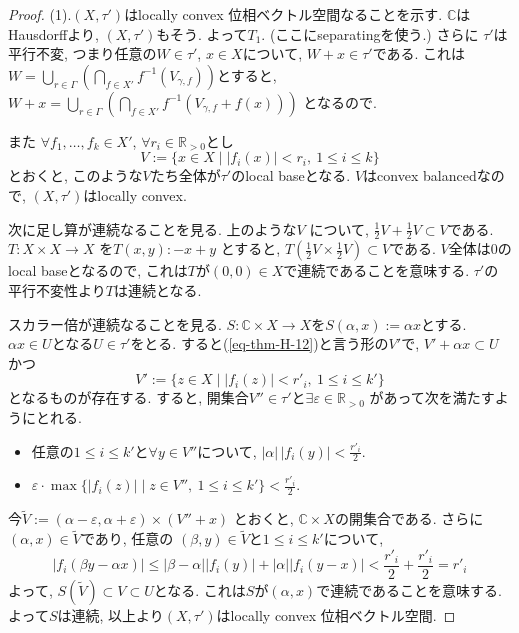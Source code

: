 \begin{proof}
(1).\((X, \tau')\)はlocally convex 位相ベクトル空間なることを示す. 
\(\mathbb{C}\)はHausdorffより, \((X, \tau')\)もそう. よって$T_1$.
(ここにseparatingを使う.)
さらに \(\tau'\)は平行不変, 
つまり任意の\(W \in \tau'\), \(x \in X\)について, \(W + x \in \tau'\)である. 
これは\(
W = \bigcup_{r \in \Gamma} \left( \bigcap_{f \in X'} f^{-1}(V_{\gamma, f}) \right)\)とすると, 
\( W + x = \bigcup_{r \in \Gamma} \left( \bigcap_{f \in X'} f^{-1}(V_{\gamma, f} + f(x)) \right)\)
となるので. 

また
 \(\forall f_1, \dots, f_k \in X'\),  \(\forall r_i \in \mathbb{R}_{>0}\)とし
\begin{equation}
\label{eq-thm-H-12}
V := \{ x \in X \mid |f_i(x)| < r_i, \ 1 \le i \le k \}
\end{equation}
とおくと, このような$V$たち全体が$\tau'$のlocal baseとなる. 
$V$はconvex balancedなので,  \((X, \tau')\)はlocally convex.

次に足し算が連続なることを見る. 
上のような\( V\) について, 
\(\frac{1}{2}V + \frac{1}{2}V \subset V\)である. 
\(T : X \times X \to X\) を\(T(x,y):-x+y\)
とすると, $T(\frac{1}{2}V \times \frac{1}{2}V ) \subset V$である. 
$V$全体は0のlocal baseとなるので, これは$T$が$(0,0) \in X$で連続であることを意味する. 
$\tau'$の平行不変性より$T$は連続となる. 

スカラー倍が連続なることを見る. 
\(S : \mathbb{C} \times X \to X\)を\(S(\alpha, x):=\alpha x\)とする. 
 \(\alpha x \in U\)となる\(U \in \tau'\)をとる. 
 すると(\ref{eq-thm-H-12})と言う形の\(V'\)で, 
  \(V' + \alpha x \subset U\)かつ
\[
V' := \{ z \in X \mid |f_i(z)| < r'_i, \ 1 \le i \le k' \}
\]
となるものが存在する. 
すると, 開集合\(V'' \in \tau'\)と\(\exists \varepsilon \in \mathbb{R}_{>0}\) があって次を満たすようにとれる.  
\begin{itemize}
\item  任意の\(1 \le i \le k'\)と\(\forall y \in V''\)について, \(|\alpha| \, |f_i(y)| < \frac{r'_i}{2}\).
\item \(\varepsilon \cdot \max \{ |f_i(z)| \mid z \in V'', \ 1 \le i \le k' \} < \frac{r'_i}{2}\).
\end{itemize}
今\(\widetilde{V} := (\alpha - \varepsilon, \alpha + \varepsilon) \times (V'' + x) \)
とおくと, $\mathbb{C} \times X$の開集合である. 
さらに\((\alpha, x) \in \widetilde{V}\)であり, 任意の
\((\beta, y) \in \widetilde{V}\)と\(1 \le i \le k'\)について, 
\[
|f_i(\beta y - \alpha x)| \le
 |\beta - \alpha| |f_i(y)| + |\alpha| |f_i(y - x)| 
 < \frac{r'_i}{2} + \frac{r'_i}{2} = r'_i
\]
よって, $S(\widetilde{V}) \subset V \subset U$となる. 
これは$S$が$(\alpha, x)$で連続であることを意味する. よって$S$は連続,
以上より\((X, \tau')\)はlocally convex 位相ベクトル空間.


\end{proof}
